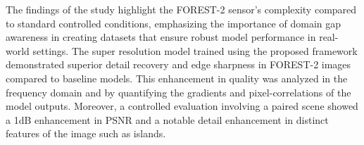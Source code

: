 The findings of the study highlight the FOREST-2 sensor's complexity compared to standard controlled conditions, emphasizing the importance of domain gap awareness in creating datasets that ensure robust model performance in real-world settings. The super resolution model trained using the proposed framework demonstrated superior detail recovery and edge sharpness in FOREST-2 images compared to baseline models. This enhancement in quality was analyzed in the frequency domain and by quantifying the gradients and pixel-correlations of the model outputs. Moreover, a controlled evaluation involving a paired scene showed a 1dB enhancement in PSNR and a notable detail enhancement in distinct features of the image such as islands.


\pagebreak